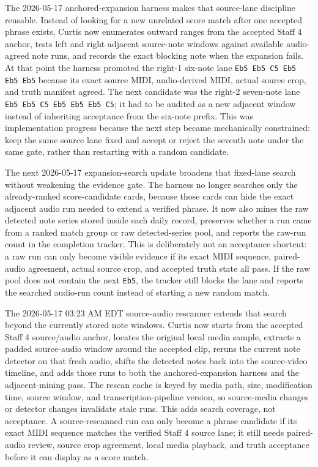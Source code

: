 \documentclass[12pt,letterpaper]{article}
\begin{document}
The 2026-05-17 anchored-expansion harness makes that source-lane discipline reusable. Instead of looking for a new unrelated score match after one accepted phrase exists, Curtis now enumerates outward ranges from the accepted Staff 4 anchor, tests left and right adjacent source-note windows against available audio-agreed note runs, and records the exact blocking note when the expansion fails. At that point the harness promoted the right-1 six-note lane \texttt{Eb5 Eb5 C5 Eb5 Eb5 Eb5} because its exact source MIDI, audio-derived MIDI, actual source crop, and truth manifest agreed. The next candidate was the right-2 seven-note lane \texttt{Eb5 Eb5 C5 Eb5 Eb5 Eb5 C5}; it had to be audited as a new adjacent window instead of inheriting acceptance from the six-note prefix. This was implementation progress because the next step became mechanically constrained: keep the same source lane fixed and accept or reject the seventh note under the same gate, rather than restarting with a random candidate.

The next 2026-05-17 expansion-search update broadens that fixed-lane search without weakening the evidence gate. The harness no longer searches only the already-ranked score-candidate cards, because those cards can hide the exact adjacent audio run needed to extend a verified phrase. It now also mines the raw detected note series stored inside each daily record, preserves whether a run came from a ranked match group or raw detected-series pool, and reports the raw-run count in the completion tracker. This is deliberately not an acceptance shortcut: a raw run can only become visible evidence if its exact MIDI sequence, paired-audio agreement, actual source crop, and accepted truth state all pass. If the raw pool does not contain the next \texttt{Eb5}, the tracker still blocks the lane and reports the searched audio-run count instead of starting a new random match.

The 2026-05-17 03:23 AM EDT source-audio rescanner extends that search beyond the currently stored note windows. Curtis now starts from the accepted Staff 4 source/audio anchor, locates the original local media sample, extracts a padded source-audio window around the accepted clip, reruns the current note detector on that fresh audio, shifts the detected notes back into the source-video timeline, and adds those runs to both the anchored-expansion harness and the adjacent-mining pass. The rescan cache is keyed by media path, size, modification time, source window, and transcription-pipeline version, so source-media changes or detector changes invalidate stale runs. This adds search coverage, not acceptance. A source-rescanned run can only become a phrase candidate if its exact MIDI sequence matches the verified Staff 4 source lane; it still needs paired-audio review, source crop agreement, local media playback, and truth acceptance before it can display as a score match.
\end{document}
